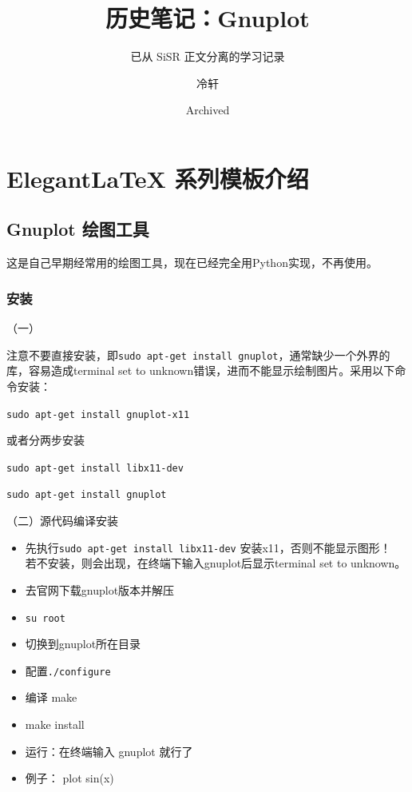 \documentclass[lang=cn,10pt,newtx]{elegantbook}
\title{历史笔记：Gnuplot}
\subtitle{已从 SiSR 正文分离的学习记录}
\author{冷轩}
\institute{SiSR 历史档案}
\date{Archived}
\begin{document}
\maketitle
\frontmatter

\tableofcontents

\mainmatter

\chapter{Elegant\LaTeX{} 系列模板介绍}


\section{Gnuplot 绘图工具}
这是自己早期经常用的绘图工具，现在已经完全用Python实现，不再使用。

\subsection{安装}
（一）

注意不要直接安装，即\verb*|sudo apt-get install gnuplot|，通常缺少一个外界的库，容易造成terminal set to unknown错误，进而不能显示绘制图片。采用以下命令安装：

\verb*|sudo apt-get install gnuplot-x11|

或者分两步安装

\verb*|sudo apt-get install libx11-dev|

\verb*|sudo apt-get install gnuplot|



（二）源代码编译安装
\begin{itemize}
\item 先执行\verb*|sudo apt-get install libx11-dev|  安装x11，否则不能显示图形！\\
若不安装，则会出现，在终端下输入gnuplot后显示terminal set to unknown。

\item 去官网下载gnuplot版本并解压

\item \verb*|su root|

\item 切换到gnuplot所在目录

\item 配置\verb*|./configure|

\item 编译 make

\item  make install

\item 运行：在终端输入 gnuplot 就行了

\item 例子： plot sin(x)
\end{itemize}
\end{document}
